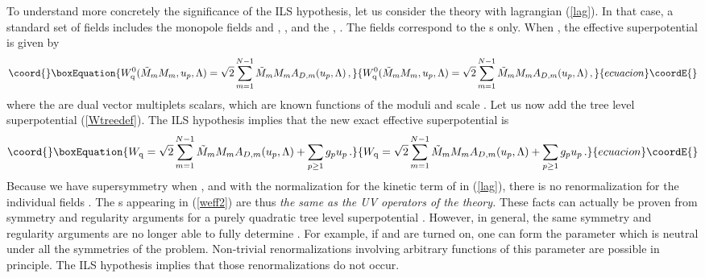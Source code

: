 \documentclass[a4paper,12pt]{article}
\def\tr{\mathop{\rm tr}\nolimits}
\def\uN{{\rm U}(N)}
\def\wt{W_{\rm tree}}\def\weff{W_{\rm eff}}\def\ww{{\cal W}}
\begin{document}
To understand more concretely the significance of the ILS hypothesis,
let us consider the \myHighlight{$\uN$}\coordHE{} theory with lagrangian
(\ref{lag}). In that case, a standard set of fields
\coordHE{} includes the monopole fields
\coordHE{} and \coordHE{}, \coordHE{}, and the
\myHighlight{$u_{p}=\tr\phi^{p}/p$}\coordHE{}, \coordHE{}. The fields \coordHE{}
correspond to the \coordHE{}s only. When \myHighlight{$\wt\rightarrow 0$}\coordHE{}, the effective
superpotential is given by \cite{SW1}
%
\begin{equation}\coord{}\boxEquation{
\label{w01}
\wq^{0}(\tilde M_{m} M_{m},u_{p},\L) = \sqrt{2}\sum_{m=1}^{N-1}
\tilde M_{m} M_{m} A_{D,m}(u_{p},\L)\, ,
}{
\wq^{0}(\tilde M_{m} M_{m},u_{p},\L) = \sqrt{2}\sum_{m=1}^{N-1}
\tilde M_{m} M_{m} A_{D,m}(u_{p},\L)\, ,
}{ecuacion}\coordE{}\end{equation}
%
where the \coordHE{} are 
dual \coordHE{}  \coordHE{} 
vector multiplets scalars, which are known functions of the moduli
\coordHE{} and scale \myHighlight{$\L$}\coordHE{} \cite{SW1,SW2}. 
Let us now add the tree level superpotential 
(\ref{Wtreedef}). The ILS hypothesis implies that the new exact 
effective superpotential is
%
\begin{equation}\coord{}\boxEquation{
\label{weff2}
\wq = \sqrt{2}\sum_{m=1}^{N-1}
\tilde M_{m} M_{m} A_{D,m}(u_{p},\L) + \sum_{p\geq 1} g_{p}u_{p}\, .
}{
\wq = \sqrt{2}\sum_{m=1}^{N-1}
\tilde M_{m} M_{m} A_{D,m}(u_{p},\L) + \sum_{p\geq 1} g_{p}u_{p}\, .
}{ecuacion}\coordE{}\end{equation}
%
Because we have \coordHE{} supersymmetry when \myHighlight{$\wt =0$}\coordHE{}, and with the
normalization for the kinetic term of \myHighlight{$\Phi$}\coordHE{} in (\ref{lag}), there is
no renormalization for the individual fields \coordHE{}. The \coordHE{}s
appearing in (\ref{weff2}) are thus {\it the same as the UV operators
\coordHE{} of the \myHighlight{$\wt =0$}\coordHE{} theory.} These facts can actually be proven
from symmetry and regularity arguments for a purely quadratic tree
level superpotential \cite{SW1}. However, in general, the same
symmetry and regularity arguments are no longer able to fully
determine \myHighlight{$\weff$}\coordHE{}. For example, if \coordHE{} and \coordHE{} are turned on,
one can form the parameter \coordHE{} which is
neutral under all the symmetries of the problem. Non-trivial
renormalizations involving arbitrary functions of this parameter are
possible in principle. The ILS hypothesis implies that those
renormalizations do not occur.
\end{document}
